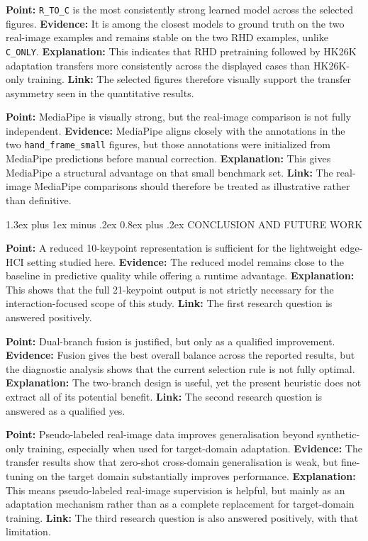 \documentclass[10pt,letterpaper]{article}
\makeatletter
\renewcommand\section{\@startsection{section}{1}{\z@}%
  {1.3ex plus 1ex minus .2ex}%
  {0.8ex plus .2ex}%
  {\centering\normalfont\small\scshape}}
\makeatother
\begin{document}
\medskip
\noindent\textbf{Point:} \texttt{R\_TO\_C} is the most consistently strong learned model across the selected figures.  
\textbf{Evidence:} It is among the closest models to ground truth on the two real-image examples and remains stable on the two RHD examples, unlike \texttt{C\_ONLY}.  
\textbf{Explanation:} This indicates that RHD pretraining followed by HK26K adaptation transfers more consistently across the displayed cases than HK26K-only training.  
\textbf{Link:} The selected figures therefore visually support the transfer asymmetry seen in the quantitative results.

\medskip
\noindent\textbf{Point:} MediaPipe is visually strong, but the real-image comparison is not fully independent.  
\textbf{Evidence:} MediaPipe aligns closely with the annotations in the two \texttt{hand\_frame\_small} figures, but those annotations were initialized from MediaPipe predictions before manual correction.  
\textbf{Explanation:} This gives MediaPipe a structural advantage on that small benchmark set.  
\textbf{Link:} The real-image MediaPipe comparisons should therefore be treated as illustrative rather than definitive.

\section{CONCLUSION AND FUTURE WORK}

\noindent\textbf{Point:} A reduced 10-keypoint representation is sufficient for the lightweight edge-HCI setting studied here.
\textbf{Evidence:} The reduced model remains close to the baseline in predictive quality while offering a runtime advantage.
\textbf{Explanation:} This shows that the full 21-keypoint output is not strictly necessary for the interaction-focused scope of this study.
\textbf{Link:} The first research question is answered positively.

\medskip
\noindent\textbf{Point:} Dual-branch fusion is justified, but only as a qualified improvement.
\textbf{Evidence:} Fusion gives the best overall balance across the reported results, but the diagnostic analysis shows that the current selection rule is not fully optimal.
\textbf{Explanation:} The two-branch design is useful, yet the present heuristic does not extract all of its potential benefit.
\textbf{Link:} The second research question is answered as a qualified yes.

\medskip
\noindent\textbf{Point:} Pseudo-labeled real-image data improves generalisation beyond synthetic-only training, especially when used for target-domain adaptation.
\textbf{Evidence:} The transfer results show that zero-shot cross-domain generalisation is weak, but fine-tuning on the target domain substantially improves performance.
\textbf{Explanation:} This means pseudo-labeled real-image supervision is helpful, but mainly as an adaptation mechanism rather than as a complete replacement for target-domain training.
\textbf{Link:} The third research question is also answered positively, with that limitation.
\end{document}
